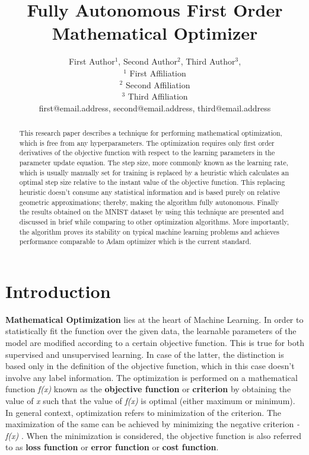 \documentclass{article}
\title{Fully Autonomous First Order Mathematical Optimizer}
\author{
First Author$^1$, 
Second Author$^2$, 
Third Author$^3$, 
\\ 
$^1$ First Affiliation \\
$^2$ Second Affiliation\\
$^3$ Third Affiliation  \\
%
first@email.address,
second@email.address,
third@email.address
}
\begin{document}
\maketitle

\begin{abstract}
This research paper describes a technique for performing mathematical optimization, which is free from any hyperparameters. The optimization requires only first order derivatives of the objective function with respect to the learning parameters in the parameter update equation. The step size, more commonly known as the learning rate, which is usually manually set for training is replaced by a heuristic which calculates an optimal step size relative to the instant value of the objective function. This replacing heuristic doesn't consume any statistical information and is based purely on relative geometric approximations; thereby, making the algorithm fully autonomous. Finally the results obtained on the MNIST dataset by using this technique are presented and discussed in brief while comparing to other optimization algorithms. More importantly, the algorithm proves its stability on typical machine learning problems and achieves performance comparable to Adam optimizer which is the current standard.
\end{abstract}

\section{Introduction}
\textbf{Mathematical Optimization} lies at the heart of Machine Learning. In order to statistically fit the function over the given data, the learnable parameters of the model are modified according to a certain objective function. This is true for both supervised and unsupervised learning. In case of the latter, the distinction is based only in the definition of the objective function, which in this case doesn’t involve any label information. The optimization is performed on a mathematical function \textit{f(x)} known as the \textbf{objective function} or \textbf{criterion} by obtaining the value of \textit{x} such that the value of \textit{f(x)} is optimal (either maximum or minimum). In general context, optimization refers to minimization of the criterion. The maximization of the same can be achieved by minimizing the negative criterion\textit{ -f(x)} \cite{goodfellow-et-al:deep-learning}. When the minimization is considered, the objective function is also referred to as \textbf{loss function} or \textbf{error function} or \textbf{cost function}.
\end{document}
